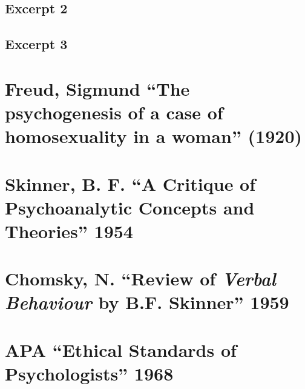 \begin{refsection}
\begin{appendices}
\subsection{Excerpt 2}
\label{excerpt2}

\label{app: KraftEbbing2}


\subsection{Excerpt 3}
\label{excerpt3}

\label{app: KraftEbbing3}


\section{Freud, Sigmund ``The psychogenesis of a case of homosexuality in a woman'' (1920)}
\label{freudsigmundthepsychogenesisofacaseofhomosexualityinawoman1920}

\label{app: Freud}


\section{Skinner, B. F. ``A Critique of Psychoanalytic Concepts and Theories'' 1954}
\label{skinnerb.f.acritiqueofpsychoanalyticconceptsandtheories1954}

\label{app: Skinner}


\section{Chomsky, N. ``Review of \emph{Verbal Behaviour} by B.F. Skinner'' 1959}
\label{chomskyn.reviewofverbalbehaviourbyb.f.skinner1959}

\label{app: Chomsky}


\section{APA ``Ethical Standards of Psychologists'' 1968}
\label{apaethicalstandardsofpsychologists1968}

\label{app: APAEthics}



\end{appendices}
\end{refsection}
